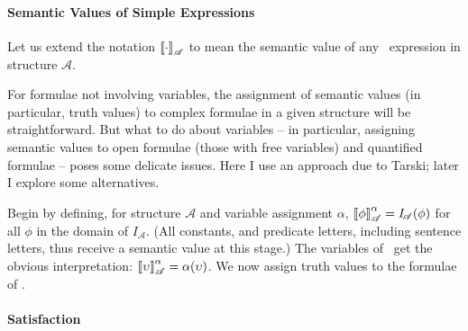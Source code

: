 \paragraph{Semantic Values of Simple Expressions}

Let us extend the notation $\left\llbracket \cdot\right\rrbracket_{\mathscr{A}}$ to mean the semantic value of any \ltwo\ expression in structure $\mathscr{A}$. 

For formulae not involving variables, the assignment of semantic values (in particular, truth values) to complex formulae in a given structure will be straightforward. But what to do about variables – in particular, assigning semantic values to open formulae (those with free variables) and quantified formulae – poses some delicate issues. Here I use an approach due to Tarski;  later  I explore some alternatives.

Begin by defining, for structure $\mathscr{A}$ and variable assignment $\alpha$, $\left\llbracket\phi\right\rrbracket^{\alpha}_{\mathscr{A}}=I_{\!\mathscr{A}}(\phi)$ for all $\phi$ in the domain of $I_{\!\mathscr{A}}$. (All constants, and predicate letters, including sentence letters, thus receive a semantic value at this stage.) The variables of \ltwo\ get the obvious interpretation: $\left\llbracket\upsilon\right\rrbracket^{\alpha}_{\mathscr{A}}=\alpha(\upsilon)$.
We now assign truth values to the formulae of \ltwo.

\paragraph{Satisfaction}

